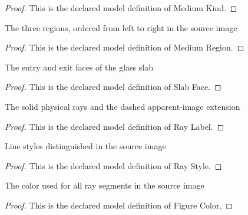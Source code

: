 \begin{proof}
  This is the declared model definition of Medium Kind.
\end{proof}
\begin{definition}
  \label{def:physics:phyx-mini-0138:phyxminiproblems-problemphyxmini0138-mediumregion}
  The three regions, ordered from left to right in the source image
\end{definition}
\begin{proof}
  This is the declared model definition of Medium Region.
\end{proof}
\begin{definition}
  \label{def:physics:phyx-mini-0138:phyxminiproblems-problemphyxmini0138-slabface}
  The entry and exit faces of the glass slab
\end{definition}
\begin{proof}
  This is the declared model definition of Slab Face.
\end{proof}
\begin{definition}
  \label{def:physics:phyx-mini-0138:phyxminiproblems-problemphyxmini0138-raylabel}
  The solid physical rays and the dashed apparent-image extension
\end{definition}
\begin{proof}
  This is the declared model definition of Ray Label.
\end{proof}
\begin{definition}
  \label{def:physics:phyx-mini-0138:phyxminiproblems-problemphyxmini0138-raystyle}
  Line styles distinguished in the source image
\end{definition}
\begin{proof}
  This is the declared model definition of Ray Style.
\end{proof}
\begin{definition}
  \label{def:physics:phyx-mini-0138:phyxminiproblems-problemphyxmini0138-figurecolor}
  The color used for all ray segments in the source image
\end{definition}
\begin{proof}
  This is the declared model definition of Figure Color.
\end{proof}
